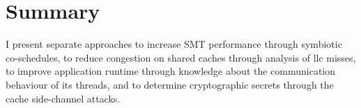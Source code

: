 \section{Summary}
\label{state:summary}

\begin{comment}
After I introduce the reader to relevant terminology, I present related
research about symbiotic \gls{smt} co-schedules and the problem of accurately
measuring the performance of a specific co-schedule.
The prime are of application for load balancing is resource congestion. Research by
\citeauthor{knauerhase_using_2008}, \citeauthor{banikazemi_pam_2008}, and
\citeauthor{zhuravlev_addressing_2012} shows that separating application
competing for cache and memory decreases and stabilises their execution times.
The research presents \gls{llc} misses of an application as indicator for
memory usage and stress put on the memory subsystem.

\cite{hofmeyr_load_2010} balances a single application with several threads.
When all threads reach a synchronization barrier and they communicate their
results.
Hence, the slowest thread lets all other threads wait.
The authors develop a model to provide each thread with equal progress
opportunity.
The knowledge of this communication relationship determines the decision of
the load balancer.

Computations are reflected in cache usage of an application.
PRIME+PROBE attacks analyse the usage of cache lines of the targeted
application and can rebuild a cryptographic secret from the observations.
Placing security critical tasks on other cores than possible attackers, reduces
the amount of cache shared, hence raises the bar for an attack.
\\

In difference to the related work, the goal in this thesis is to design and
implement a load balancer, which mainly uses online measurements to decide on a
thread-to-core mapping.
Also, it should consider communication relationships and security requirements.
While previous research uses \gls{cmp} style processors, I use a \gls{smp} type
processor.
\Gls{cmp} is more similar to a multi-socket system, due to the separated
\gls{llc} between two processors on one die.
\end{comment}

I present separate approaches to increase SMT performance through symbiotic
co-schedules, to reduce congestion on shared caches through analysis of
\gls{llc} misses, to improve application runtime through knowledge about the
communication behaviour of its threads, and to determine cryptographic secrets
through the cache side-channel attacks.

